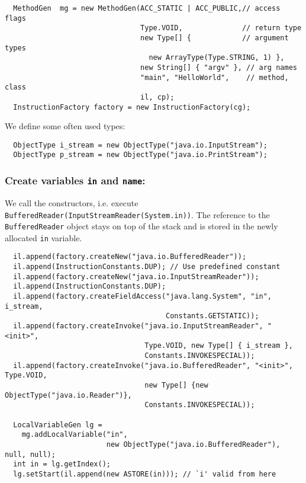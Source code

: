 {\small\begin{verbatim}
  MethodGen  mg = new MethodGen(ACC_STATIC | ACC_PUBLIC,// access flags
                                Type.VOID,              // return type
                                new Type[] {            // argument types
                                  new ArrayType(Type.STRING, 1) },
                                new String[] { "argv" }, // arg names
                                "main", "HelloWorld",    // method, class
                                il, cp);
  InstructionFactory factory = new InstructionFactory(cg);
\end{verbatim}}

We define some often used types:

{\small\begin{verbatim}
  ObjectType i_stream = new ObjectType("java.io.InputStream");
  ObjectType p_stream = new ObjectType("java.io.PrintStream");
\end{verbatim}}

\subsubsection{Create variables \texttt{in} and \texttt{name}:}

We call the           constructors,              i.e.              execute
\texttt{BufferedReader(Input\-Stream\-Reader(System.in))}.  The  reference
to the \texttt{BufferedReader} object stays on top of the stack and is
stored in the newly allocated \texttt{in} variable.

{\small\begin{verbatim}
  il.append(factory.createNew("java.io.BufferedReader"));
  il.append(InstructionConstants.DUP); // Use predefined constant
  il.append(factory.createNew("java.io.InputStreamReader"));
  il.append(InstructionConstants.DUP);
  il.append(factory.createFieldAccess("java.lang.System", "in", i_stream,
                                      Constants.GETSTATIC));
  il.append(factory.createInvoke("java.io.InputStreamReader", "<init>",
                                 Type.VOID, new Type[] { i_stream },
                                 Constants.INVOKESPECIAL));
  il.append(factory.createInvoke("java.io.BufferedReader", "<init>", Type.VOID,
                                 new Type[] {new ObjectType("java.io.Reader")},
                                 Constants.INVOKESPECIAL));

  LocalVariableGen lg =
    mg.addLocalVariable("in",
                        new ObjectType("java.io.BufferedReader"), null, null);
  int in = lg.getIndex();
  lg.setStart(il.append(new ASTORE(in))); // `i' valid from here
\end{verbatim}}

